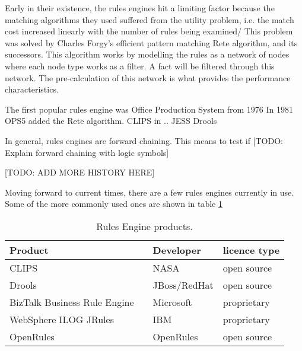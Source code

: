 Early in their existence, the rules engines hit a limiting factor because the matching algorithms they used suffered from the utility problem, i.e. the match cost increased linearly with the number of rules being examined/
This problem was solved by Charles Forgy's efficient pattern matching Rete algorithm\cite{forgy1989rete}, and its successors.
This algorithm works by modelling the rules as a network of nodes where each node type works as a filter.
A fact will be filtered through this network.
The pre-calculation of this network is what provides the performance characteristics.

The first popular rules engine was Office Production System from 1976 
In 1981 OPS5 added the Rete algorithm.
CLIPS in  ..
JESS
Drools 



In general, rules engines are forward chaining.
This means to test if 
[TODO: Explain forward chaining with logic symbols] 

[TODO: ADD MORE HISTORY HERE]

Moving forward to current times, there are a few rules engines currently in use.
Some of the more commonly used ones are shown in table \ref{table:RuleEngines}

\begin{table}
    \begin{center}
        \begin{tabular}{ |l c |l|l| } 
            \hline
            Product                      &                             & Developer    & licence type   \\
            \hline
            CLIPS                        &\cite{CLIPSProductPage}      & NASA         & open source    \\ 
            Drools                       &\cite{DroolsProductPage}     & JBoss/RedHat & open source    \\ 
            BizTalk Business Rule Engine &\cite{BiztalkProductPage}    & Microsoft    & proprietary    \\ 
            WebSphere ILOG JRules        &\cite{JRulesProductPage}     & IBM          & proprietary    \\ 
            OpenRules                    &\cite{OpenRulesProductPage}  & OpenRules    & open source    \\ 
            \hline
        \end{tabular}
    \end{center}
    \caption{Rules Engine products.}
    \label{table:RuleEngines}
\end{table}

